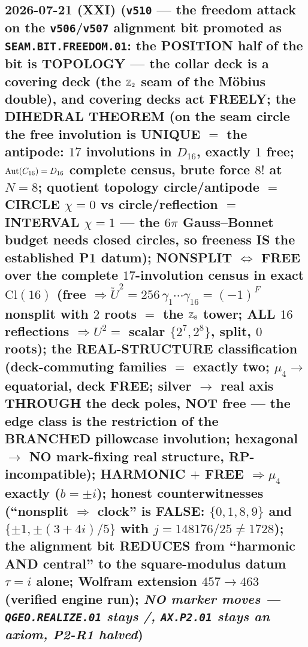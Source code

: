 \subsection*{2026-07-21 (XXI) (\texttt{v510} --- the freedom attack on the \texttt{v506}/\texttt{v507} alignment bit promoted as \texttt{SEAM.BIT.FREEDOM.01}: the POSITION half of the bit is TOPOLOGY --- the collar deck is a covering deck (the $\mathbb{Z}_2$ seam of the M\"obius double), and covering decks act FREELY; the DIHEDRAL THEOREM (on the seam circle the free involution is UNIQUE $=$ the antipode: $17$ involutions in $D_{16}$, exactly $1$ free; $\operatorname{Aut}(C_{16})=D_{16}$ complete census, brute force $8!$ at $N{=}8$; quotient topology circle/antipode $=$ CIRCLE $\chi{=}0$ vs circle/reflection $=$ INTERVAL $\chi{=}1$ --- the $6\pi$ Gauss--Bonnet budget needs closed circles, so freeness IS the established P1 datum); NONSPLIT $\iff$ FREE over the complete $17$-involution census in exact $\mathrm{Cl}(16)$ (free $\Rightarrow\tilde U^2=256\,\gamma_1\cdots\gamma_{16}=(-1)^F$ nonsplit with $2$ roots $=$ the $\mathbb{Z}_8$ tower; ALL $16$ reflections $\Rightarrow U^2=$ scalar $\{2^7,2^8\}$, split, $0$ roots); the REAL-STRUCTURE classification (deck-commuting families $=$ exactly two; $\mu_4\to$ equatorial, deck FREE; silver $\to$ real axis THROUGH the deck poles, NOT free --- the edge class is the restriction of the BRANCHED pillowcase involution; hexagonal $\to$ NO mark-fixing real structure, RP-incompatible); HARMONIC $+$ FREE $\Rightarrow\mu_4$ exactly ($b=\pm i$); honest counterwitnesses (``nonsplit $\Rightarrow$ clock'' is FALSE: $\{0,1,8,9\}$ and $\{\pm1,\pm(3{+}4i)/5\}$ with $j=148176/25\neq1728$); the alignment bit REDUCES from ``harmonic AND central'' to the square-modulus datum $\tau=i$ alone; Wolfram extension $457\to463$ (verified engine run); \emph{NO marker moves --- \texttt{QGEO.REALIZE.01} stays \mC/\mO, \texttt{AX.P2.01} stays an axiom, P2-R1 halved})}
